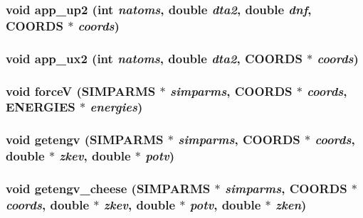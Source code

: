 \subsubsection{\setlength{\rightskip}{0pt plus 5cm}void app\_\-up2 (int {\em natoms}, double {\em dta2}, double {\em dnf}, {\bf COORDS} $\ast$ {\em coords})}\label{thomas_2md__baro_8c_e572784a592d8e297ffde89f7d61b579}


\subsubsection{\setlength{\rightskip}{0pt plus 5cm}void app\_\-ux2 (int {\em natoms}, double {\em dta2}, {\bf COORDS} $\ast$ {\em coords})}\label{thomas_2md__baro_8c_0e7fc8608a044c8629b0d4498ff55ac8}


\subsubsection{\setlength{\rightskip}{0pt plus 5cm}void force\-V ({\bf SIMPARMS} $\ast$ {\em simparms}, {\bf COORDS} $\ast$ {\em coords}, {\bf ENERGIES} $\ast$ {\em energies})}\label{thomas_2md__baro_8c_f41913430c6c7a45b9342969f7d3299b}


\subsubsection{\setlength{\rightskip}{0pt plus 5cm}void getengv ({\bf SIMPARMS} $\ast$ {\em simparms}, {\bf COORDS} $\ast$ {\em coords}, double $\ast$ {\em zkev}, double $\ast$ {\em potv})}\label{thomas_2md__baro_8c_8f6b220b5497a9d83e02b4949112aa6b}


\subsubsection{\setlength{\rightskip}{0pt plus 5cm}void getengv\_\-cheese ({\bf SIMPARMS} $\ast$ {\em simparms}, {\bf COORDS} $\ast$ {\em coords}, double $\ast$ {\em zkev}, double $\ast$ {\em potv}, double $\ast$ {\em zken})}\label{thomas_2md__baro_8c_254a20535f90eca030f210db5ed233fc}


